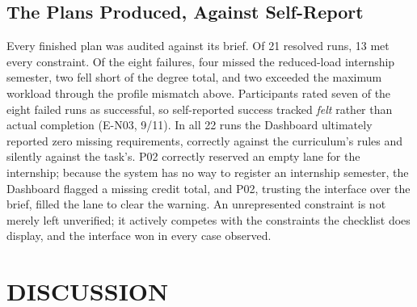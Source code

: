 \documentclass[a4paper,twoside]{article}
\begin{document}
\subsection{The Plans Produced, Against Self-Report}

Every finished plan was audited against its brief. Of 21 resolved runs, 13 met every constraint. Of the eight failures, four missed the reduced-load internship semester, two fell short of the degree total, and two exceeded the maximum workload through the profile mismatch above. Participants rated seven of the eight failed runs as successful, so self-reported success tracked \emph{felt} rather than actual completion (E-N03, 9/11). In all 22 runs the Dashboard ultimately reported zero missing requirements, correctly against the curriculum's rules and silently against the task's. P02 correctly reserved an empty lane for the internship; because the system has no way to register an internship semester, the Dashboard flagged a missing credit total, and P02, trusting the interface over the brief, filled the lane to clear the warning. An unrepresented constraint is not merely left unverified; it actively competes with the constraints the checklist does display, and the interface won in every case observed.

\section{\uppercase{Discussion}}
\label{sec:discussion}
\end{document}
